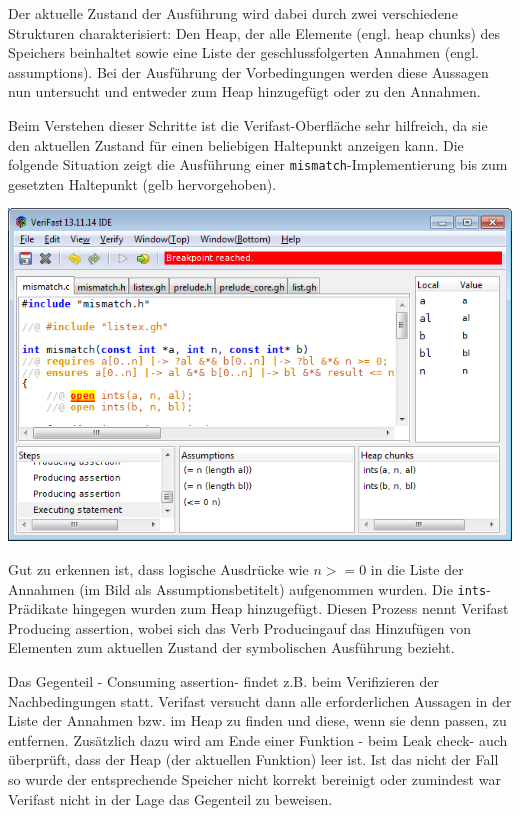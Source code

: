 Der aktuelle Zustand der Ausführung wird dabei durch zwei verschiedene Strukturen charakterisiert: 
Den Heap, der alle Elemente (engl. heap chunks) des Speichers beinhaltet sowie eine Liste
der geschlussfolgerten Annahmen (engl. assumptions). Bei der Ausführung der Vorbedingungen werden
diese Aussagen nun untersucht und entweder zum Heap hinzugefügt oder zu den Annahmen.

Beim Verstehen dieser Schritte ist die Verifast-Oberfläche sehr hilfreich, da sie den aktuellen
Zustand für einen beliebigen Haltepunkt anzeigen kann. Die folgende Situation zeigt die Ausführung
einer \lstinline{mismatch}-Implementierung bis zum gesetzten Haltepunkt (gelb hervorgehoben).

\begin{center}
\includegraphics[width=1.0\textwidth]{images/verifast-state-after-precondition.png}
\end{center}

Gut zu erkennen ist, dass logische Ausdrücke wie \(n >= 0\) in die Liste der Annahmen 
(im Bild als \glqq Assumptions\grqq betitelt) aufgenommen wurden. Die \lstinline{ints}-Prädikate hingegen
wurden zum Heap hinzugefügt. Diesen Prozess nennt Verifast \glqq Producing assertion\grqq, wobei sich das Verb
\glqq Producing\grqq auf das Hinzufügen von Elementen zum aktuellen Zustand der symbolischen Ausführung
bezieht.

Das Gegenteil - \glqq Consuming assertion\grqq - findet z.B. beim Verifizieren der Nachbedingungen statt.
Verifast versucht dann alle erforderlichen Aussagen in der Liste der Annahmen bzw. im Heap zu finden
und diese, wenn sie denn passen, zu entfernen. Zusätzlich dazu wird am Ende einer Funktion - beim 
\glqq Leak check\grqq - auch überprüft, dass der Heap (der aktuellen Funktion) leer ist. Ist das nicht 
der Fall so wurde der entsprechende Speicher nicht korrekt bereinigt oder zumindest war Verifast nicht 
in der Lage das Gegenteil zu beweisen.

